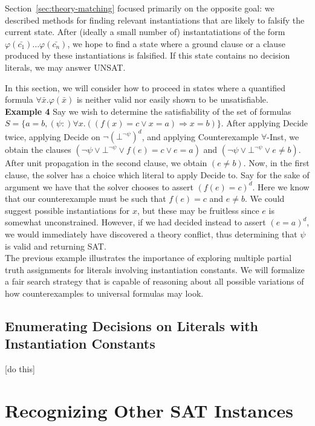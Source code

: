 \documentclass{llncs}
\begin{document}
Section~\ref{sec:theory-matching} focused primarily on the opposite goal: we described methods for finding relevant instantiations that are likely to falsify the current state.
After (ideally a small number of) instantatiations of the form $\varphi( \bar{c_1} ) \ldots \varphi( \bar{c_n} )$, we hope to find a state where a ground clause or a clause produced by these instantiations is falsified.
If this state contains no decision literals, we may answer UNSAT.

In this section, we will consider how to proceed in states where a quantified formula $\forall \bar{x}. \varphi( \bar{x} )$ is neither valid nor easily shown to be unsatisfiable. \\

{\bf Example 4} 
Say we wish to determine the satisfiability of the set of formulas $S = \{ a = b, (\psi :) \forall x. ((f(x) = c \vee x = a) \Rightarrow x = b) \}$.
After applying Decide twice, applying Decide on $\neg (\bot^{ \neg \psi })^d$, and applying Counterexample $\forall$-Inst, we obtain the clauses $( \neg \psi \vee \bot^{ \neg \psi } \vee f(e) = c \vee e = a )$ and $( \neg \psi \vee \bot^{ \neg \psi } \vee e \neq b )$.
After unit propagation in the second clause, we obtain $( e \neq b )$.
Now, in the first clause, the solver has a choice which literal to apply Decide to.
Say for the sake of argument we have that the solver chooses to assert $( f(e) = c )^d$.
Here we know that our counterexample must be such that $f( e ) = c$ and $e \neq b$.
We could suggest possible instantiations for $x$, but these may be fruitless since $e$ is somewhat unconstrained.
However, if we had decided instead to assert $( e = a )^d$, we would immediately have discovered a theory conflict, thus determining that $\psi$ is valid and returning SAT. \\

The previous example illustrates the importance of exploring multiple partial truth assignments for literals involving instantiation constants.
We will formalize a fair search strategy that is capable of reasoning about all possible variations of how counterexamples to universal formulas may look.

\subsection{Enumerating Decisions on Literals with Instantiation Constants}

[do this]

\section{Recognizing Other SAT Instances}
\end{document}
